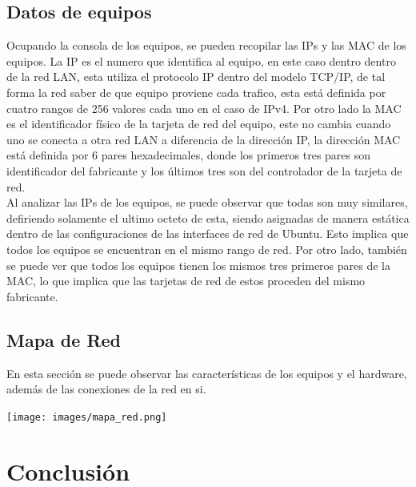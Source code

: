 \documentclass[spanish]{udpreport}
\begin{document}
\section{Datos de equipos}
Ocupando la consola de los equipos, se pueden recopilar las IPs y las MAC de los equipos. La IP es el numero que identifica al equipo, en este caso dentro dentro de la red LAN, esta utiliza el protocolo IP dentro del modelo TCP/IP, de tal forma la red saber de que equipo proviene cada trafico, esta está definida por cuatro rangos de 256 valores cada uno en el caso de IPv4. Por otro lado la MAC es el identificador físico de la tarjeta de red del equipo, este no cambia cuando uno se conecta a otra red LAN a diferencia de la dirección IP, la dirección MAC está definida por 6 pares hexadecimales, donde los primeros tres pares son identificador del fabricante y los últimos tres son del controlador de la tarjeta de red.
\\

\setlength{\parindent}{0.5cm} Al analizar las IPs de los equipos, se puede observar que todas son muy similares, defiriendo solamente el ultimo octeto de esta, siendo asignadas de manera estática dentro de las configuraciones de las interfaces de red de Ubuntu. Esto implica que todos los equipos se encuentran en el mismo rango de red. Por otro lado, también se puede ver que todos los equipos tienen los mismos tres primeros pares de la MAC, lo que implica que las tarjetas de red de estos proceden del mismo fabricante.



\pagebreak
\section{Mapa de Red}
En esta sección se puede observar las características de los equipos y el hardware, además de las conexiones de la red en si. 
\begin{center}
	\texttt{[image: images/mapa\_red.png]} 
\end{center}

\listoffigures

\chapter{Conclusión}
\end{document}
